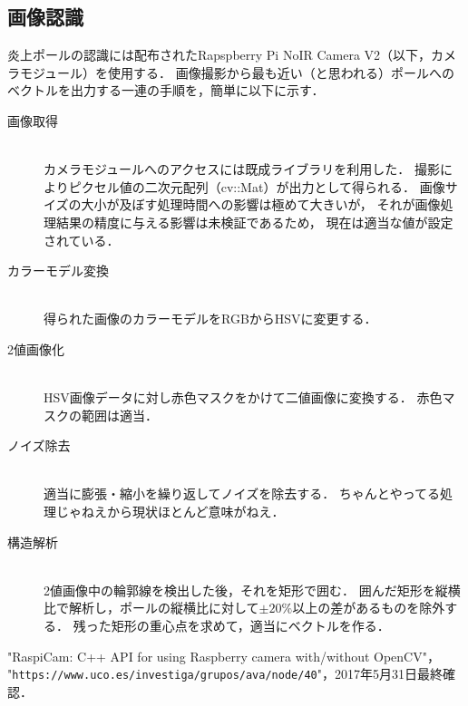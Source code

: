 \documentclass[11pt,a4paper]{jsarticle}
\begin{document}
\subsection{画像認識}
  炎上ポールの認識には配布されたRapspberry Pi NoIR Camera V2（以下，カメラモジュール）を使用する．
  画像撮影から最も近い（と思われる）ポールへのベクトルを出力する一連の手順を，簡単に以下に示す．

  \begin{description}
    \item[画像取得] \mbox{} \\
      カメラモジュールへのアクセスには既成ライブラリ\cite{raspicam}を利用した．
      撮影によりピクセル値の二次元配列（cv::Mat）が出力として得られる．
      画像サイズの大小が及ぼす処理時間への影響は極めて大きいが，
      それが画像処理結果の精度に与える影響は未検証であるため，
      現在は適当な値が設定されている．\\
    \item[カラーモデル変換] \mbox{} \\
      得られた画像のカラーモデルをRGBからHSVに変更する．\\
    \item[2値画像化] \mbox{} \\
      HSV画像データに対し赤色マスクをかけて二値画像に変換する．
      赤色マスクの範囲は適当．\\
    \item[ノイズ除去] \mbox{} \\
      適当に膨張・縮小を繰り返してノイズを除去する．
      ちゃんとやってる処理じゃねえから現状ほとんど意味がねえ．\\
    \item[構造解析] \mbox{} \\
      2値画像中の輪郭線を検出した後，それを矩形で囲む．
      囲んだ矩形を縦横比で解析し，ポールの縦横比に対して$\pm 20 \%$以上の差があるものを除外する．
      残った矩形の重心点を求めて，適当にベクトルを作る．\\
  \end{description}

\begin{thebibliography}{9}
   "RaspiCam: C++ API for using Raspberry camera with/without OpenCV"，\\
                     "\texttt{https://www.uco.es/investiga/grupos/ava/node/40}"，2017年5月31日最終確認．
\end{thebibliography}
\end{document}
